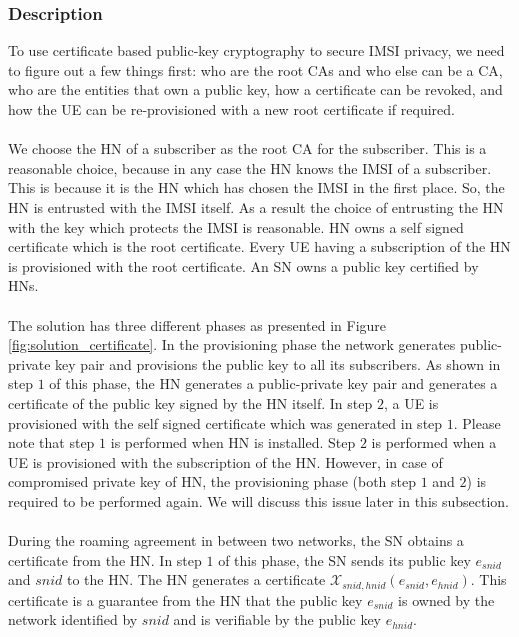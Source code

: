 \documentclass[lnicst,sechang,a4paper]{svmultln}
\begin{document}
\subsubsection{Description}
To use certificate based public-key cryptography to secure IMSI privacy, we need to figure out a few things first: who are the root CAs and who else can be a CA, who are the entities that own a public key, how a certificate can be revoked, and how the UE can be re-provisioned with a new root certificate if required.
\paragraph{}
We choose the HN of a subscriber as the root CA for the subscriber. This is a reasonable choice, because in any case the HN knows the IMSI of a subscriber. This is because it is the HN which has chosen the IMSI in the first place. So, the HN is entrusted with the IMSI itself. As a result the choice of entrusting the HN with the key which protects the IMSI is reasonable. HN owns a self signed certificate which is the root certificate. Every UE having a subscription of the HN is provisioned with the root certificate. An SN owns a public key certified by HNs. 
\paragraph{}
The solution has three different phases as presented in Figure \ref{fig:solution_certificate}. In the provisioning phase the network generates public-private key pair and provisions the public key to all its subscribers. As shown in step $1$ of this phase, the HN generates a public-private key pair and generates a certificate of the public key signed by the HN itself.  In step $2$, a UE is provisioned with the self signed certificate which was generated in step $1$. Please note that step $1$ is performed when HN is installed. Step $2$ is performed when a UE is provisioned with the subscription of the HN. However, in case of compromised private key of HN, the provisioning phase (both step $1$ and $2$) is required to be performed again. We will discuss this issue later in this subsection. 
\paragraph{}
During the roaming agreement in between two networks, the SN obtains a certificate from the HN. In step $1$ of this phase, the SN sends its public key $e_{snid}$ and $snid$ to the HN. The HN generates a certificate $\mathcal{X}_{snid,hnid} (e_{snid},e_{hnid})$. This certificate is a guarantee from the HN that the public key $e_{snid}$ is owned by the network identified by $snid$ and is verifiable by the public key $e_{hnid}$.
\end{document}
